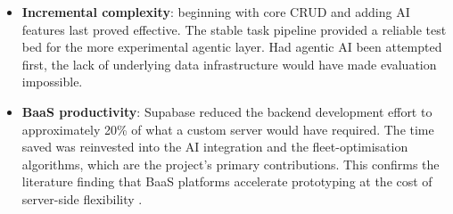 \begin{itemize}
  \item \textbf{Incremental complexity}: beginning with core CRUD and
        adding AI features last proved effective.  The stable task pipeline
        provided a reliable test bed for the more experimental agentic
        layer.  Had agentic AI been attempted first, the lack of
        underlying data infrastructure would have made evaluation
        impossible.
  \item \textbf{BaaS productivity}: Supabase reduced the backend
        development effort to approximately 20\% of what a custom server
        would have required.  The time saved was reinvested into the
        AI integration and the fleet-optimisation algorithms, which are
        the project's primary contributions.  This confirms the
        literature finding that BaaS platforms accelerate prototyping
        at the cost of server-side flexibility
        \autocite{supabase2026docs}.
\end{itemize}
